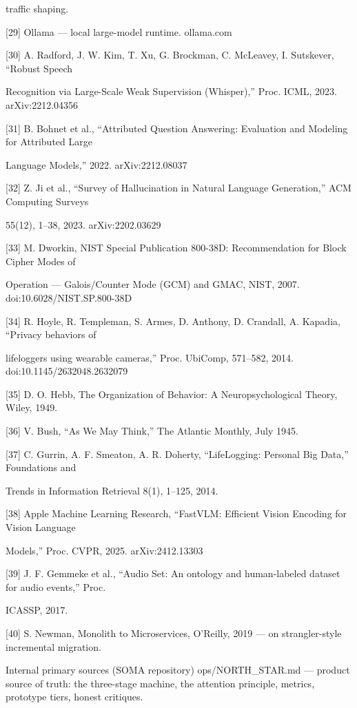 traffic shaping.

{[}29{]} Ollama --- local large-model runtime. ollama.com

{[}30{]} A. Radford, J. W. Kim, T. Xu, G. Brockman, C. McLeavey, I. Sutskever, ``Robust Speech

Recognition via Large-Scale Weak Supervision (Whisper),'' Proc. ICML, 2023. arXiv:2212.04356

{[}31{]} B. Bohnet et al., ``Attributed Question Answering: Evaluation and Modeling for Attributed Large

Language Models,'' 2022. arXiv:2212.08037

{[}32{]} Z. Ji et al., ``Survey of Hallucination in Natural Language Generation,'' ACM Computing Surveys

55(12), 1--38, 2023. arXiv:2202.03629

{[}33{]} M. Dworkin, NIST Special Publication 800-38D: Recommendation for Block Cipher Modes of

Operation --- Galois/Counter Mode (GCM) and GMAC, NIST, 2007. doi:10.6028/NIST.SP.800-38D

{[}34{]} R. Hoyle, R. Templeman, S. Armes, D. Anthony, D. Crandall, A. Kapadia, ``Privacy behaviors of

lifeloggers using wearable cameras,'' Proc. UbiComp, 571--582, 2014. doi:10.1145/2632048.2632079

{[}35{]} D. O. Hebb, The Organization of Behavior: A Neuropsychological Theory, Wiley, 1949.

{[}36{]} V. Bush, ``As We May Think,'' The Atlantic Monthly, July 1945.

{[}37{]} C. Gurrin, A. F. Smeaton, A. R. Doherty, ``LifeLogging: Personal Big Data,'' Foundations and

Trends in Information Retrieval 8(1), 1--125, 2014.

{[}38{]} Apple Machine Learning Research, ``FastVLM: Efficient Vision Encoding for Vision Language

Models,'' Proc. CVPR, 2025. arXiv:2412.13303

{[}39{]} J. F. Gemmeke et al., ``Audio Set: An ontology and human-labeled dataset for audio events,'' Proc.

ICASSP, 2017.

{[}40{]} S. Newman, Monolith to Microservices, O'Reilly, 2019 --- on strangler-style incremental migration.

Internal primary sources (SOMA repository) ops/NORTH\_STAR.md --- product source of truth: the three-stage machine, the attention principle, metrics, prototype tiers, honest critiques.

